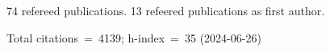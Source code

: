74 refereed publications. 13 refeered publications as first author.

Total citations~=~4139; h-index~=~35 (2024-06-26)